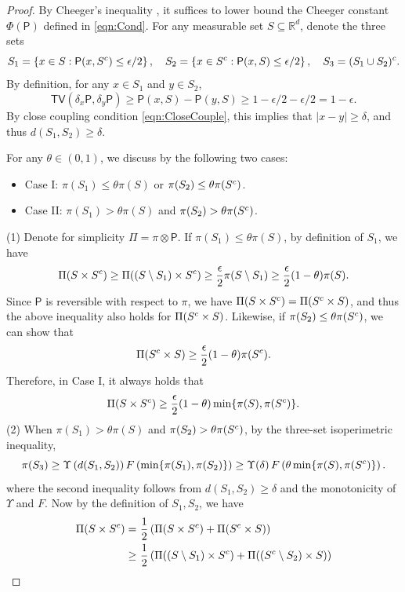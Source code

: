 \documentclass[10pt,a4paper]{amsart}
\newcommand{\Brac}[1]{\left(#1\right)}
\newcommand{\TV}{\mathsf{TV}}
\newcommand{\mR}{\mathbb{R}}
\newcommand{\matc}{^{\rm c}}
\newcommand{\norme}[1]{\left|#1\right|}
\newcommand{\sfP}{\mathsf{P}}
\begin{document}
\begin{proof}
By Cheeger's inequality , it suffices to lower bound the Cheeger constant $\Phi(\sfP)$ defined in \eqref{eqn:Cond}.
%
For any measurable set $S \subseteq \mR^d$, denote the three sets
\[
    S_1 = \left\{ x \in S: \sfP(x,S\matc) \le \epsilon/2 \right\}, \quad S_2 = \left\{ x \in S\matc: \sfP(x,S) \le \epsilon/2 \right\}, \quad S_3 = (S_1\cup S_2)\matc.
\]
By definition, for any $x\in S_1$ and $y \in S_2$,
\[
    \TV \Brac{ \delta_x \sfP , \delta_y \sfP } \ge \sfP(x,S) - \sfP(y,S) \ge 1 - \epsilon/2 - \epsilon/2 = 1 - \epsilon.
\]
By close coupling condition \eqref{eqn:CloseCouple}, this implies that $\norme{x-y} \ge \delta$, and thus $d(S_1,S_2) \ge \delta$. 


For any $\theta \in (0,1)$, we discuss by the following two cases: 
\begin{itemize}
    \item Case I: $\pi(S_1) \le \theta \pi(S)$ or $\pi(S_2) \le \theta \pi(S\matc)$.
    \item Case II: $ \pi(S_1) > \theta \pi(S)$ and $ \pi(S_2) > \theta \pi(S\matc)$.
\end{itemize}
(1) Denote for simplicity $\Pi = \pi \otimes \sfP$. If $\pi(S_1) \le \theta \pi(S)$, by definition of $S_1$, we have
\[
    \Pi(S \times S\matc) \ge \Pi((S\setminus S_1) \times S\matc) \ge \frac{\epsilon}{2}  \pi(S\setminus S_1) \ge \frac{\epsilon}{2} (1-\theta) \pi(S).
\]
%
Since $\sfP$ is reversible with respect to $\pi$, we have $\Pi(S \times S\matc) = \Pi(S\matc \times S)$, and thus the above inequality also holds for $\Pi(S\matc \times S)$.
Likewise, if $\pi(S_2) \le \theta \pi(S\matc)$, we can show that
\[
    \Pi(S\matc \times S) \ge \frac{\epsilon}{2} (1-\theta) \pi(S\matc).
\]
Therefore, in Case I, it always holds that
\[
    \Pi(S \times S\matc) \ge \frac{\epsilon}{2} (1-\theta) \min \{ \pi(S), \pi(S\matc) \}.
\]
(2) When $ \pi(S_1) > \theta \pi(S)$ and $ \pi(S_2) > \theta \pi(S\matc)$, by the three-set isoperimetric inequality,
\[
    \pi(S_3) \ge \Upsilon \Brac{ d(S_1,S_2) } F \Brac{ \min \{ \pi(S_1), \pi(S_2) \} } \ge \Upsilon(\delta)\, F \Brac{ \theta \min \{ \pi(S), \pi(S\matc) \} }.
\]
where the second inequality follows from $d(S_1,S_2) \ge \delta$ and the monotonicity of $\Upsilon$ and $F$.
Now by the definition of $S_1,S_2$, we have
\begin{align*}
    \Pi(S \times S\matc) =~& \frac{1}{2} \Brac{ \Pi(S \times S\matc) + \Pi(S\matc \times S) } \\
    \ge~& \frac{1}{2} \Brac{ \Pi((S\setminus S_1) \times S\matc) + \Pi((S\matc\setminus S_2) \times S) } \\

\end{align*}
\end{proof}
\end{document}
